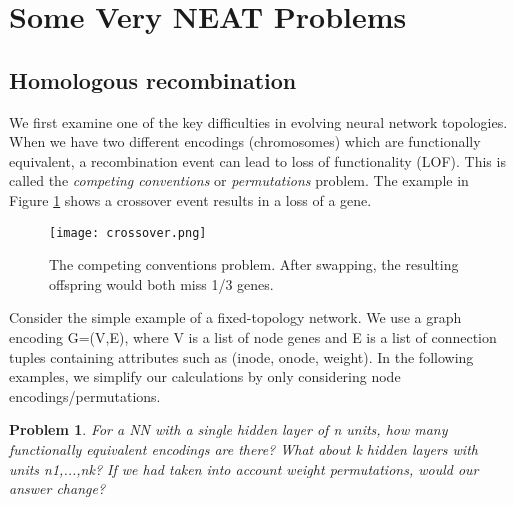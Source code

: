 \documentclass[12pt]{article}
\newtheorem{problem}{Problem}
\begin{document}
\section{Some Very NEAT Problems}
\subsection{Homologous recombination}

We first examine one of the key difficulties in evolving neural network topologies. When we have two different encodings (chromosomes) which are functionally equivalent, a recombination event can lead to loss of functionality (LOF). This is called the \textit{competing conventions} or \textit{permutations} problem. The example in Figure \ref{fig:crossover} shows a crossover event results in a loss of a gene.

\begin{figure}
    \centering
    \texttt{[image: crossover.png]}
    \caption{The competing conventions problem. After swapping, the resulting offspring would both miss 1/3 genes.}
    \label{fig:crossover}
\end{figure}

Consider the simple example of a fixed-topology network. We use a graph encoding G=(V,E), where V is a list of node genes and E is a list of connection tuples containing attributes such as (inode, onode, weight). In the following examples, we simplify our calculations by only considering node encodings/permutations.

\begin{problem} For a NN with a single hidden layer of n units, how many functionally equivalent encodings are there? What about k hidden layers with units n1,...,nk? If we had taken into account weight permutations, would our answer change?
\end{problem}
\end{document}
